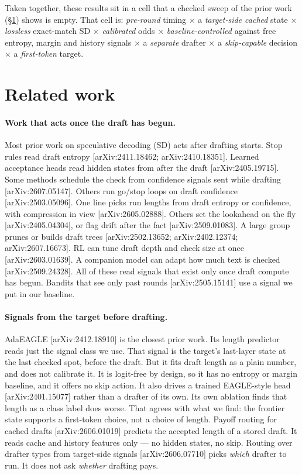 \documentclass[11pt]{article}
\begin{document}
Taken together, these results sit in a cell that a checked sweep of the
prior work (\S\ref{sec:related}) shows is empty. That cell is: \emph{pre-round}
timing $\times$ a \emph{target-side cached} state $\times$ \emph{lossless}
exact-match SD $\times$ \emph{calibrated} odds $\times$
\emph{baseline-controlled} against free entropy, margin and history signals
$\times$ a \emph{separate} drafter $\times$ a \emph{skip-capable} decision
$\times$ a \emph{first-token} target.

\section{Related work}
\label{sec:related}

\paragraph{Work that acts once the draft has begun.} Most prior work on
speculative decoding (SD) acts after drafting starts. Stop rules read draft
entropy [arXiv:2411.18462; arXiv:2410.18351]. Learned acceptance heads read
hidden states from after the draft [arXiv:2405.19715]. Some methods schedule
the check from confidence signals sent while drafting [arXiv:2607.05147].
Others run go/stop loops on draft confidence [arXiv:2503.05096]. One line picks run lengths from
draft entropy or confidence, with compression in view [arXiv:2605.02888].
Others set the lookahead on the fly [arXiv:2405.04304], or flag drift after
the fact [arXiv:2509.01083]. A large group prunes or builds draft trees
[arXiv:2502.13652; arXiv:2402.12374; arXiv:2607.16673]. RL can tune draft
depth and check size at once [arXiv:2603.01639]. A companion model can adapt
how much text is checked [arXiv:2509.24328]. All of these read signals that
exist only once draft compute has begun. Bandits that see only past rounds
[arXiv:2505.15141] use a signal we put in our baseline.

\paragraph{Signals from the target before drafting.} AdaEAGLE
[arXiv:2412.18910] is the closest prior work. Its length predictor reads just
the signal class we use. That signal is the target's last-layer state at the
last checked spot, before the draft. But it fits draft length as a plain
number, and does not calibrate it. It is logit-free by design, so it has no
entropy or margin baseline, and it offers no skip action. It also drives a
trained EAGLE-style head [arXiv:2401.15077] rather than a drafter of its own.
Its own ablation finds that length as a class label does worse. That agrees with what we find: the
frontier state supports a first-token choice, not a choice of length. Payoff
routing for cached drafts [arXiv:2606.01019] predicts the accepted length of a
stored draft. It reads cache and history features only --- no hidden states,
no skip. Routing over drafter types from target-side signals
[arXiv:2606.07710] picks \emph{which} drafter to run. It does not ask
\emph{whether} drafting pays.
\end{document}
